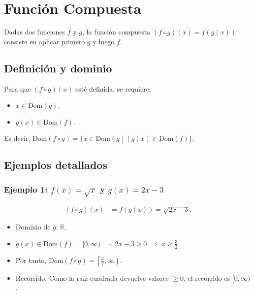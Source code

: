 \documentclass[12pt,a4paper]{article}
\newcommand{\Dominio}{\ensuremath{\mathrm{Dom}}}
\begin{document}
\section{Función Compuesta}

Dadas dos funciones $f$ y $g$, la función compuesta $(f\circ g)(x)=f(g(x))$ consiste en aplicar primero $g$ y luego $f$.

\subsection{Definición y dominio}
\begin{tcolorbox}[colback=orange!5, colframe=orange!70!black, title=Dominio de la composición]
Para que $(f\circ g)(x)$ esté definida, se requiere:
\begin{itemize}
    \item $x\in\Dominio(g)$.
    \item $g(x)\in\Dominio(f)$.
\end{itemize}
Es decir, $\Dominio(f\circ g) = \{x\in\Dominio(g) \mid g(x)\in\Dominio(f)\}$.
\end{tcolorbox}

\subsection{Ejemplos detallados}

\subsubsection{Ejemplo 1: $f(x)=\sqrt{x}$ y $g(x)=2x-3$}
\begin{align*}
    (f\circ g)(x) &= f(g(x)) = \sqrt{2x-3}.
\end{align*}
\begin{itemize}
    \item Dominio de $g$: $\mathbb{R}$.
    \item $g(x)\in\Dominio(f)=[0,\infty) \;\Rightarrow\; 2x-3 \geq 0 \;\Rightarrow\; x \geq \frac{3}{2}$.
    \item Por tanto, $\Dominio(f\circ g) = \left[\frac{3}{2},\infty\right)$.
    \item Recorrido: Como la raíz cuadrada devuelve valores $\geq 0$, el recorrido es $[0,\infty)$.
\end{itemize}
\end{document}
